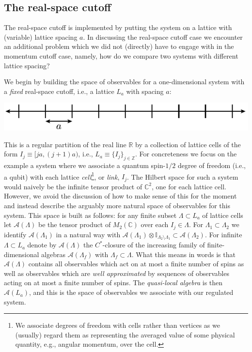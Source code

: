 \documentclass[11pt]{amsart}
\theoremstyle{plain}%
\theoremstyle{definition}
\theoremstyle{remark}
\begin{document}
\subsection{The real-space cutoff}
The real-space cutoff is implemented by putting the system on a lattice with (variable) lattice spacing $a$. In discussing the real-space cutoff case we encounter an additional problem which we did not (directly) have to engage with in the momentum cutoff case, namely, how do we compare two systems with different lattice spacing? 

We begin by building the space of observables for a one-dimensional system with a \emph{fixed} real-space cutoff, i.e., a lattice $L_a$ with spacing $a$: 
\begin{center}
	\includegraphics{lattice.pdf}
\end{center}
This is a regular partition of the real line $\mathbb{R}$ by a collection of lattice cells of the form $I_j \equiv [ja, (j+1)a)$, i.e., $L_a \equiv \{I_j\}_{j\in \mathbb{Z}}$. For concreteness we focus on the example a system where we associate a quantum spin-$1/2$ degree of freedom (i.e., a qubit) with each lattice \emph{cell}\footnote{We associate degrees of freedom with cells rather than vertices as we (usually) regard them as representing the averaged value of some physical quantity, e.g., angular momentum, over the cell.}, or \emph{link}, $I_j$. The Hilbert space for such a system would naively be the infinite tensor product of $\mathbb{C}^2$, one for each lattice cell. However, we avoid the discussion of how to make sense of this for the moment and instead describe the arguably more natural space of observables for this system. This space is built as follows: for any finite subset $\Lambda \subset L_a$ of lattice cells let $\mathcal{A}(\Lambda)$ be the tensor product of $M_2(\mathbb{C})$ over each $I_j\in \Lambda$. For $\Lambda_1\subset \Lambda_2$ we identify $\mathcal{A}(\Lambda_1)$ in a natural way with $\mathcal{A}(\Lambda_1)\otimes \mathbb{I}_{\Lambda_2\setminus \Lambda_1} \subset \mathcal{A}(\Lambda_2)$. For infinite $\Lambda \subset L_a$ denote by $\mathcal{A}(\Lambda)$ the $C^*$-closure of the increasing family of finite-dimensional algebras $\mathcal{A}(\Lambda_f)$ with $\Lambda_f \subset \Lambda$. What this means in words is that $\mathcal{A}(\Lambda)$ contains all observables which act on at most a finite number of spins as well as observables which are \emph{well approximated} by sequences of observables acting on at most a finite number of spins. The \emph{quasi-local algebra} is then $\mathcal{A}(L_a)$, and this is the space of observables we associate with our regulated system. 
\end{document}
